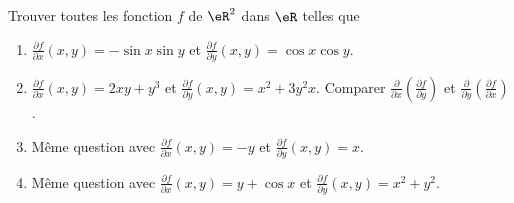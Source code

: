 \begin{exercice}\label{exoCalculDifferentiel0008}

	Trouver toutes les fonction $f$ de $\eR^2$ dans $\eR$ telles que
	\begin{enumerate}
		\item\minsyndical
	$\frac{\partial f}{\partial x}(x,y) = -\sin x \sin y$
	et
	$\frac{\partial f}{\partial y}(x,y) = \cos x \cos y$.

	\item\boringexo
	$\frac{\partial f}{\partial x}(x,y) = 2xy +y^3$
	et
	$\frac{\partial f}{\partial y}(x,y) = x^2 + 3y^2 x$.
	Comparer $\frac{\partial }{\partial x} \left(\frac{\partial f}{\partial y} \right)$
	et   $\frac{\partial }{\partial y} \left(\frac{\partial f}{\partial x} \right)$.

	\item\minsyndical
	Même question avec 
	$\frac{\partial f}{\partial x}(x,y) = -y$
	et
	$\frac{\partial f}{\partial y}(x,y) = x$.

	\item\boringexo
	Même question avec 
	$\frac{\partial f}{\partial x}(x,y) =  y + \cos x $
	et
	$\frac{\partial f}{\partial y}(x,y) = x^2 + y^2 $.
			
	\end{enumerate}
 
\end{exercice}
